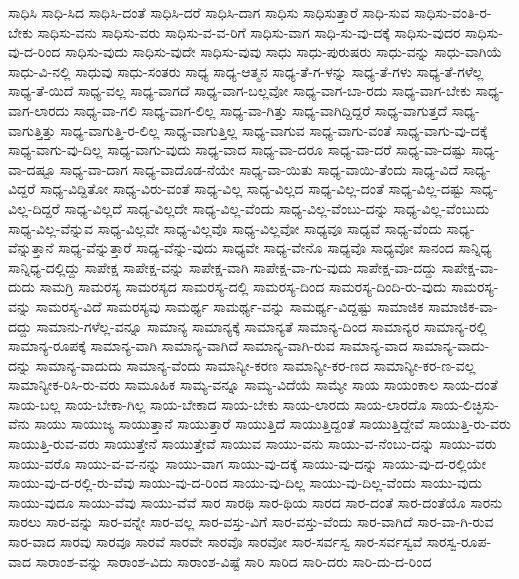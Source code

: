 {ಸಾಧಿಸಿ
ಸಾಧಿ-ಸಿದ
ಸಾಧಿಸಿ-ದಂತೆ
ಸಾಧಿಸಿ-ದರೆ
ಸಾಧಿಸಿ-ದಾಗ
ಸಾಧಿಸು
ಸಾಧಿಸುತ್ತಾರೆ
ಸಾಧಿ-ಸುವ
ಸಾಧಿಸು-ವಂತಿ-ರ-ಬೇಕು
ಸಾಧಿಸು-ವನು
ಸಾಧಿಸು-ವರು
ಸಾಧಿಸು-ವ-ವ-ರಿಗೆ
ಸಾಧಿಸು-ವಾಗ
ಸಾಧಿ-ಸು-ವು-ದಕ್ಕೆ
ಸಾಧಿಸು-ವುದರ
ಸಾಧಿಸು-ವು-ದ-ರಿಂದ
ಸಾಧಿಸು-ವುದು
ಸಾಧಿಸು-ವುದೇ
ಸಾಧಿಸು-ವುವು
ಸಾಧು
ಸಾಧು-ಪುರುಷರು
ಸಾಧು-ವನ್ನು
ಸಾಧು-ವಾಗಿಯೆ
ಸಾಧು-ವಿ-ನಲ್ಲಿ
ಸಾಧುವು
ಸಾಧು-ಸಂತರು
ಸಾಧ್ಯ
ಸಾಧ್ಯ-ಆತ್ಮನ
ಸಾಧ್ಯ-ತೆ-ಗ-ಳನ್ನು
ಸಾಧ್ಯ-ತೆ-ಗಳು
ಸಾಧ್ಯ-ತೆ-ಗಳೆಲ್ಲ
ಸಾಧ್ಯ-ತೆ-ಯಿದೆ
ಸಾಧ್ಯ-ವಲ್ಲ
ಸಾಧ್ಯ-ವಾಗದೆ
ಸಾಧ್ಯ-ವಾಗ-ಬಲ್ಲವೋ
ಸಾಧ್ಯ-ವಾಗ-ಬಾ-ರದು
ಸಾಧ್ಯ-ವಾಗ-ಬೇಕು
ಸಾಧ್ಯ-ವಾಗ-ಲಾರದು
ಸಾಧ್ಯ-ವಾ-ಗಲಿ
ಸಾಧ್ಯ-ವಾಗ-ಲಿಲ್ಲ
ಸಾಧ್ಯ-ವಾ-ಗಿತ್ತು
ಸಾಧ್ಯ-ವಾಗಿದ್ದಿದ್ದರೆ
ಸಾಧ್ಯ-ವಾಗುತ್ತದೆ
ಸಾಧ್ಯ-ವಾಗುತ್ತಿತ್ತು
ಸಾಧ್ಯ-ವಾಗುತ್ತಿ-ರ-ಲಿಲ್ಲ
ಸಾಧ್ಯ-ವಾಗುತ್ತಿಲ್ಲ
ಸಾಧ್ಯ-ವಾಗುವ
ಸಾಧ್ಯ-ವಾಗು-ವಂತೆ
ಸಾಧ್ಯ-ವಾಗು-ವು-ದಕ್ಕೆ
ಸಾಧ್ಯ-ವಾಗು-ವು-ದಿಲ್ಲ
ಸಾಧ್ಯ-ವಾಗು-ವುದು
ಸಾಧ್ಯ-ವಾದ
ಸಾಧ್ಯ-ವಾ-ದರೂ
ಸಾಧ್ಯ-ವಾ-ದರೆ
ಸಾಧ್ಯ-ವಾ-ದಷ್ಟು
ಸಾಧ್ಯ-ವಾ-ದಷ್ಟೂ
ಸಾಧ್ಯ-ವಾ-ದಾಗ
ಸಾಧ್ಯ-ವಾದೊಡ-ನೆಯೇ
ಸಾಧ್ಯ-ವಾ-ಯಿತು
ಸಾಧ್ಯ-ವಾಯಿ-ತೆಂದು
ಸಾಧ್ಯ-ವಿದೆ
ಸಾಧ್ಯ-ವಿದ್ದರೆ
ಸಾಧ್ಯ-ವಿದ್ದಿತೋ
ಸಾಧ್ಯ-ವಿರು-ವಂತೆ
ಸಾಧ್ಯ-ವಿಲ್ಲ
ಸಾಧ್ಯ-ವಿಲ್ಲದ
ಸಾಧ್ಯ-ವಿಲ್ಲ-ದಂತೆ
ಸಾಧ್ಯ-ವಿಲ್ಲ-ದಷ್ಟು
ಸಾಧ್ಯ-ವಿಲ್ಲ-ದಿದ್ದರೆ
ಸಾಧ್ಯ-ವಿಲ್ಲದೆ
ಸಾಧ್ಯ-ವಿಲ್ಲದೇ
ಸಾಧ್ಯ-ವಿಲ್ಲ-ವೆಂದು
ಸಾಧ್ಯ-ವಿಲ್ಲ-ವೆಂಬು-ದನ್ನು
ಸಾಧ್ಯ-ವಿಲ್ಲ-ವೆಂಬುದು
ಸಾಧ್ಯ-ವಿಲ್ಲ-ವೆನ್ನುವ
ಸಾಧ್ಯ-ವಿಲ್ಲವೇ
ಸಾಧ್ಯ-ವಿಲ್ಲವೊ
ಸಾಧ್ಯ-ವಿಲ್ಲವೋ
ಸಾಧ್ಯವೂ
ಸಾಧ್ಯವೆ
ಸಾಧ್ಯ-ವೆಂದು
ಸಾಧ್ಯ-ವೆನ್ನುತ್ತಾನೆ
ಸಾಧ್ಯ-ವೆನ್ನುತ್ತಾರೆ
ಸಾಧ್ಯ-ವೆನ್ನು-ವುದು
ಸಾಧ್ಯವೇ
ಸಾಧ್ಯ-ವೇನೊ
ಸಾಧ್ಯವೊ
ಸಾಧ್ಯವೋ
ಸಾನಂದ
ಸಾನ್ನಿಧ್ಯ
ಸಾನ್ನಿಧ್ಯ-ದಲ್ಲಿದ್ದು
ಸಾಪೇಕ್ಷ
ಸಾಪೇಕ್ಷ-ವನ್ನು
ಸಾಪೇಕ್ಷ-ವಾಗಿ
ಸಾಪೇಕ್ಷ-ವಾ-ಗು-ವುದು
ಸಾಪೇಕ್ಷ-ವಾ-ದದ್ದು
ಸಾಪೇಕ್ಷ-ವಾ-ದುದು
ಸಾಮಗ್ರಿ
ಸಾಮರಸ್ಯ
ಸಾಮರಸ್ಯದ
ಸಾಮರಸ್ಯ-ದಲ್ಲಿ
ಸಾಮರಸ್ಯ-ದಿಂದ
ಸಾಮರಸ್ಯ-ದಿಂದಿ-ರು-ವುದು
ಸಾಮರಸ್ಯ-ವನ್ನು
ಸಾಮರಸ್ಯ-ವಿದೆ
ಸಾಮರಸ್ಯವು
ಸಾಮರ್ಥ್ಯ
ಸಾಮರ್ಥ್ಯ-ವನ್ನು
ಸಾಮರ್ಥ್ಯ-ವಿದ್ದಷ್ಟು
ಸಾಮಾಜಿಕ
ಸಾಮಾಜಿಕ-ವಾ-ದದ್ದು
ಸಾಮಾನು-ಗಳೆಲ್ಲ-ವನ್ನೂ
ಸಾಮಾನ್ಯ
ಸಾಮಾನ್ಯಕ್ಕೆ
ಸಾಮಾನ್ಯತೆ
ಸಾಮಾನ್ಯ-ದಿಂದ
ಸಾಮಾನ್ಯರ
ಸಾಮಾನ್ಯ-ರಲ್ಲಿ
ಸಾಮಾನ್ಯ-ರೂಪಕ್ಕೆ
ಸಾಮಾನ್ಯ-ವಾಗಿ
ಸಾಮಾನ್ಯ-ವಾಗಿದೆ
ಸಾಮಾನ್ಯ-ವಾಗಿ-ರುವ
ಸಾಮಾನ್ಯ-ವಾದ
ಸಾಮಾನ್ಯ-ವಾದು-ದನ್ನು
ಸಾಮಾನ್ಯ-ವಾದುದು
ಸಾಮಾನ್ಯ-ವೆಂದು
ಸಾಮಾನ್ಯೀ-ಕರಣ
ಸಾಮಾನ್ಯೀ-ಕರ-ಣದ
ಸಾಮಾನ್ಯೀ-ಕರ-ಣ-ವಲ್ಲ
ಸಾಮಾನ್ಯೀಕ-ರಿಸಿ-ರು-ವರು
ಸಾಮೂಹಿಕ
ಸಾಮ್ಯ-ವನ್ನೂ
ಸಾಮ್ಯ-ವಿದೆಯೆ
ಸಾಮ್ಯೇ
ಸಾಯ
ಸಾಯಂಕಾಲ
ಸಾಯ-ದಂತೆ
ಸಾಯ-ಬಲ್ಲ
ಸಾಯ-ಬೇಕಾ-ಗಿಲ್ಲ
ಸಾಯ-ಬೇಕಾದ
ಸಾಯ-ಬೇಕು
ಸಾಯ-ಲಾರದು
ಸಾಯ-ಲಾರದೊ
ಸಾಯ-ಲಿಚ್ಛಿಸು-ವೆನು
ಸಾಯು
ಸಾಯುಜ್ಯ
ಸಾಯುತ್ತಾನೆ
ಸಾಯುತ್ತಾರೆ
ಸಾಯುತ್ತಿದೆ
ಸಾಯುತ್ತಿದ್ದಂತೆ
ಸಾಯುತ್ತಿದ್ದೇವೆ
ಸಾಯುತ್ತಿ-ರು-ವರು
ಸಾಯುತ್ತಿ-ರುವ-ವರು
ಸಾಯುತ್ತೇನೆ
ಸಾಯುತ್ತೇವೆ
ಸಾಯುವ
ಸಾಯು-ವನು
ಸಾಯು-ವ-ನೆಂಬು-ದನ್ನು
ಸಾಯು-ವರು
ಸಾಯು-ವರೊ
ಸಾಯು-ವ-ವ-ನನ್ನು
ಸಾಯು-ವಾಗ
ಸಾಯು-ವು-ದಕ್ಕೆ
ಸಾಯು-ವು-ದನ್ನು
ಸಾಯು-ವು-ದ-ರಲ್ಲಿಯೇ
ಸಾಯು-ವು-ದ-ರಲ್ಲಿ-ರು-ವೆವು
ಸಾಯು-ವು-ದ-ರಿಂದ
ಸಾಯು-ವು-ದಿಲ್ಲ
ಸಾಯು-ವು-ದಿಲ್ಲ-ವೆಂದು
ಸಾಯು-ವುದು
ಸಾಯು-ವುದೂ
ಸಾಯು-ವೆವು
ಸಾಯು-ವೆವೆ
ಸಾರ
ಸಾರಥಿ
ಸಾರ-ಥಿಯ
ಸಾರದ
ಸಾರ-ದಂತೆ
ಸಾರ-ದಂತೆಯೊ
ಸಾರನು
ಸಾರಲು
ಸಾರ-ವನ್ನು
ಸಾರ-ವನ್ನೇ
ಸಾರ-ವಲ್ಲ
ಸಾರ-ವಸ್ತು-ವಿಗೆ
ಸಾರ-ವಸ್ತು-ವೆಂದು
ಸಾರ-ವಾಗಿದೆ
ಸಾರ-ವಾ-ಗಿ-ರುವ
ಸಾರ-ವಾದ
ಸಾರವು
ಸಾರವೂ
ಸಾರವೆ
ಸಾರವೇ
ಸಾರವೊ
ಸಾರವೋ
ಸಾರ-ಸರ್ವಸ್ವ
ಸಾರ-ಸರ್ವಸ್ವವೆ
ಸಾರಸ್ವ-ರೂಪ-ವಾದ
ಸಾರಾಂಶ-ವನ್ನು
ಸಾರಾಂಶ-ವಿದು
ಸಾರಾಂಶ-ವಿಷ್ಟೆ
ಸಾರಿ
ಸಾರಿದ
ಸಾರಿ-ದರು
ಸಾರಿ-ದು-ದ-ರಿಂದ
}
